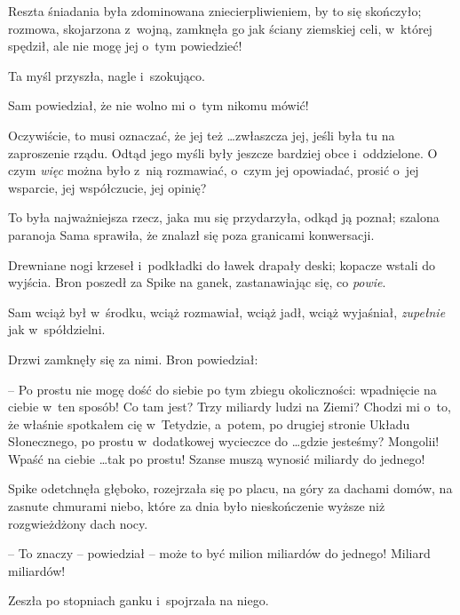 \documentclass[oneside,polish,11pt,rmheadings]{mwbk}
\begin{document}
Reszta śniadania była zdominowana zniecierpliwieniem, by to się skończyło; rozmowa, skojarzona z~wojną, zamknęła go jak ściany ziemskiej celi, w~której spędził, ale nie mogę jej o~tym powiedzieć! 

Ta myśl przyszła, nagle i~szokująco. 

Sam powiedział, że nie wolno mi o~tym nikomu mówić! 

Oczywiście, to musi oznaczać, że jej też \ldots  zwłaszcza jej, jeśli była tu na zaproszenie rządu. Odtąd jego myśli były jeszcze bardziej obce i~oddzielone. O czym \textit{więc } można było z~nią rozmawiać, o~czym jej opowiadać, prosić o~jej wsparcie, jej współczucie, jej opinię? 

To była najważniejsza rzecz, jaka mu się przydarzyła, odkąd ją poznał; szalona paranoja Sama sprawiła, że znalazł się poza granicami konwersacji. 

Drewniane nogi krzeseł i~podkładki do ławek drapały deski; kopacze wstali do wyjścia. Bron poszedł za Spike na ganek, zastanawiając się, co \textit{powie}. 

Sam wciąż był w~środku, wciąż rozmawiał, wciąż jadł, wciąż wyjaśniał, \textit{zupełnie }jak w~spółdzielni. 

Drzwi zamknęły się za nimi. Bron powiedział: 

-- Po prostu nie mogę dość do siebie po tym zbiegu okoliczności: wpadnięcie na ciebie w~ten sposób! Co tam jest? Trzy miliardy ludzi na Ziemi? Chodzi mi o~to, że właśnie spotkałem cię w~Tetydzie, a~potem, po drugiej stronie Układu Słonecznego, po prostu w~dodatkowej wycieczce do \ldots  gdzie jesteśmy? Mongolii! Wpaść na ciebie \ldots  tak po prostu! Szanse muszą wynosić miliardy do jednego!

Spike odetchnęła głęboko, rozejrzała się po placu, na góry za dachami domów, na zasnute chmurami niebo, które za dnia było nieskończenie wyższe niż rozgwieżdżony dach nocy. 

-- To znaczy -- powiedział -- może to być milion miliardów do jednego! Miliard miliardów! 

Zeszła po stopniach ganku i~spojrzała na niego. 
\end{document}
